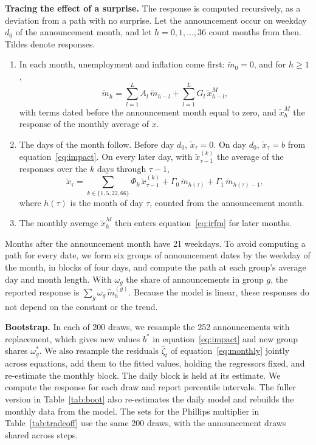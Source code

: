 \documentclass[11pt]{article}
\begin{document}
\textbf{Tracing the effect of a surprise.} The response is computed recursively, as a deviation from a path with no surprise. Let the announcement occur on weekday $d_0$ of the announcement month, and let $h=0,1,\ldots,36$ count months from then. Tildes denote responses.
\begin{enumerate}
\item In each month, unemployment and inflation come first: $\tilde m_0=0$, and for $h\geq 1$,
\begin{equation}
\tilde m_h = \sum_{l=1}^{L} A_l\, \tilde m_{h-l} + \sum_{l=1}^{L} G_l\, \tilde x^{M}_{h-l}, \label{eq:irfm}
\end{equation}
with terms dated before the announcement month equal to zero, and $\tilde x^{M}_{h}$ the response of the monthly average of $x$.
\item The days of the month follow. Before day $d_0$, $\tilde x_\tau=0$. On day $d_0$, $\tilde x_\tau=b$ from equation~\eqref{eq:impact}. On every later day, with $\tilde x^{(k)}_{\tau-1}$ the average of the responses over the $k$ days through $\tau-1$,
\begin{equation}
\tilde x_\tau = \sum_{k\in\{1,5,22,66\}} \Phi_{k}\, \tilde x_{\tau-1}^{(k)} + \Gamma_0\, \tilde m_{h(\tau)} + \Gamma_1\, \tilde m_{h(\tau)-1}, \label{eq:irfd}
\end{equation}
where $h(\tau)$ is the month of day $\tau$, counted from the announcement month.
\item The monthly average $\tilde x^{M}_h$ then enters equation~\eqref{eq:irfm} for later months.
\end{enumerate}
Months after the announcement month have 21 weekdays. To avoid computing a path for every date, we form six groups of announcement dates by the weekday of the month, in blocks of four days, and compute the path at each group's average day and month length. With $\omega_g$ the share of announcements in group $g$, the reported response is $\sum_g \omega_g\, \tilde m_h^{(g)}$. Because the model is linear, these responses do not depend on the constant or the trend.

\textbf{Bootstrap.} In each of 200 draws, we resample the 252 announcements with replacement, which gives new values $b^{*}$ in equation~\eqref{eq:impact} and new group shares $\omega_g^{*}$. We also resample the residuals $\hat\zeta_t$ of equation~\eqref{eq:monthly} jointly across equations, add them to the fitted values, holding the regressors fixed, and re-estimate the monthly block. The daily block is held at its estimate. We compute the response for each draw and report percentile intervals. The fuller version in Table~\ref{tab:boot} also re-estimates the daily model and rebuilds the monthly data from the model. The sets for the Phillips multiplier in Table~\ref{tab:tradeoff} use the same 200 draws, with the announcement draws shared across steps.
\end{document}
